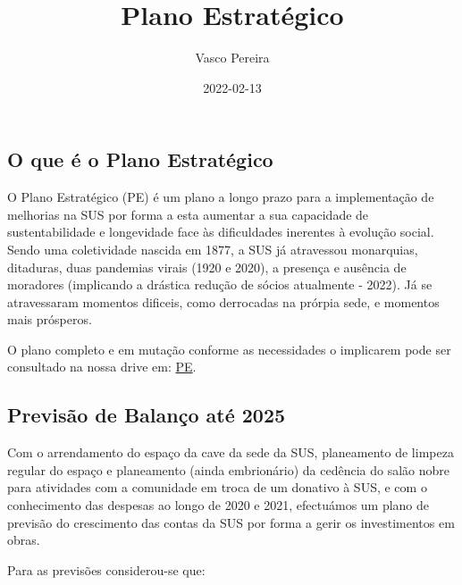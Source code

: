 \documentclass[
]{article}
\title{Plano Estratégico}
\author{Vasco Pereira}
\date{2022-02-13}
\begin{document}
\maketitle

\hypertarget{o-que-uxe9-o-plano-estratuxe9gico}{%
\subsection{O que é o Plano
Estratégico}\label{o-que-uxe9-o-plano-estratuxe9gico}}

O Plano Estratégico (PE) é um plano a longo prazo para a implementação
de melhorias na SUS por forma a esta aumentar a sua capacidade de
sustentabilidade e longevidade face às dificuldades inerentes à evolução
social. Sendo uma coletividade nascida em 1877, a SUS já atravessou
monarquias, ditaduras, duas pandemias virais (1920 e 2020), a presença e
ausência de moradores (implicando a drástica redução de sócios
atualmente - 2022). Já se atravessaram momentos dificeis, como
derrocadas na prórpia sede, e momentos mais prósperos.

O plano completo e em mutação conforme as necessidades o implicarem pode
ser consultado na nossa drive em:
\href{https://docs.google.com/document/d/1kXc2k4UWPusVrfWMdYjRdWl646QRQDKt_nVB_pibd7g/edit?usp=sharing}{PE}.

\hypertarget{previsuxe3o-de-balanuxe7o-atuxe9-2025}{%
\subsection{Previsão de Balanço até
2025}\label{previsuxe3o-de-balanuxe7o-atuxe9-2025}}

Com o arrendamento do espaço da cave da sede da SUS, planeamento de
limpeza regular do espaço e planeamento (ainda embrionário) da cedência
do salão nobre para atividades com a comunidade em troca de um donativo
à SUS, e com o conhecimento das despesas ao longo de 2020 e 2021,
efectuámos um plano de previsão do crescimento das contas da SUS por
forma a gerir os investimentos em obras.

Para as previsões considerou-se que:
\end{document}
